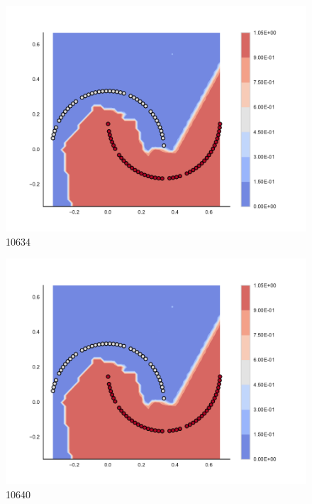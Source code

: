 \begin{subfigure}[b]{0.09\textwidth}
    \includegraphics[clip, trim=2.35cm 1.75cm 4.5cm 0cm,width=\textwidth]{img/convergence/10634.pdf}
    \caption{10634}
    \label{fig:convergence_10634}
\end{subfigure}
%
\begin{subfigure}[b]{0.09\textwidth}
    \includegraphics[clip, trim=2.35cm 1.75cm 4.5cm 0cm,width=\textwidth]{img/convergence/10640.pdf}
    \caption{10640}
    \label{fig:convergence_10640}
\end{subfigure}
%
